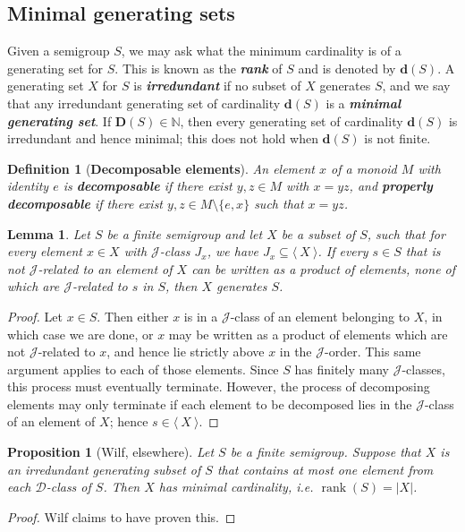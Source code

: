 \documentclass[11pt]{article}
\newtheorem{prop}[thm]{Proposition}
\newtheorem{lemma}[thm]{Lemma}
\newtheorem{defi}[thm]{Definition}
\newenvironment{de}[1][]{\begin{defi}[#1]\rm}{\end{defi}}
\newcommand{\defn}[1]{\textbf{\textit{#1}}}
\numberwithin{equation}{section}
\newcommand{\genset}[1]{\ensuremath{\langle\: #1 \:\rangle}}
\newcommand{\D}{\mathscr{D}}
\newcommand{\J}{\mathscr{J}}
\newcommand{\N}{\mathbb{N}}
\newcommand{\rank}{\operatorname{rank}}
\begin{document}
\subsection{Minimal generating sets}

Given a semigroup $S$, we may ask what the minimum cardinality is of a
generating set for $S$. This is known as the \defn{rank} of $S$ and is denoted
by $\mathbf{d}(S)$. A generating set $X$ for $S$ is \defn{irredundant} if no
subset of $X$ generates $S$, and we say that any irredundant generating set of
cardinality $\mathbf{d}(S)$ is a \defn{minimal generating set}. If
$\mathbf{D}(S) \in \N$, then every generating set of cardinality $\mathbf{d}(S)$
is irredundant and hence minimal; this does not hold when $\mathbf{d}(S)$ is not
finite.

\begin{de}[\textbf{Decomposable elements}]
  An element $x$ of a monoid $M$ with identity $e$ is \defn{decomposable} if
  there exist $y, z \in M$ with $x = yz$, and \defn{properly decomposable} if
  there exist $y, z \in M\setminus\{e, x\}$ such that $x = yz$.
\end{de}

\begin{lemma}
  Let $S$ be a finite semigroup and let $X$ be a subset of $S$, such that for
  every element $x \in X$ with $\J$-class $J_x$, we have $J_x \subseteq
  \genset{X}$. If every $s \in S$ that is not $\J$-related to an element of $X$
  can be written as a product of elements, none of which are $\J$-related to $s$
  in $S$, then $X$ generates $S$. 
\end{lemma}
\begin{proof}
  Let $x \in S$. Then either $x$ is in a $\J$-class of an element belonging to
  $X$, in which case we are done, or $x$ may be written as a product of elements
  which are not $\J$-related to $x$, and hence lie strictly above $x$ in the
  $\J$-order. This same argument applies to each of those elements. Since $S$
  has finitely many $\J$-classes, this process must eventually terminate.
  However, the process of decomposing elements may only terminate if each
  element to be decomposed lies in the $\J$-class of an element of $X$; hence $s
  \in \genset{X}$.
\end{proof}

\begin{prop}[Wilf, elsewhere]
  Let $S$ be a finite semigroup.  Suppose that $X$ is an irredundant generating
  subset of $S$ that contains at most one element from each $\D$-class of $S$.
  Then $X$ has minimal cardinality, i.e. $\rank(S) = |X|$.
\end{prop}
\begin{proof}
  Wilf claims to have proven this.
\end{proof}
\end{document}
